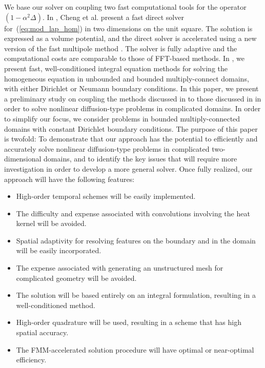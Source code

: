 \documentclass[preprint,12pt]{elsarticle}
\newcommand{\eqr}[1]{~(\ref{#1})}
\begin{document}
We base our solver on coupling two fast computational tools for the operator $(1-\alpha^2 \Delta)$. 
In \cite{modified:helmholtz}, Cheng et al. present a fast direct solver for\eqr{eq:mod_lap_hom} in two dimensions on the unit square.  
The solution is expressed as a volume potential, and the direct solver is accelerated using a new version of the fast multipole method \cite{screened_coulomb, new_FMM}. 
The solver is fully adaptive and the computational costs are comparable to those of FFT-based methods.
In \cite{KROP_QUAIFE_1}, we present fast, well-conditioned integral equation methods for solving the homogeneous equation in unbounded and bounded multiply-connect domains, with either Dirichlet or Neumann boundary conditions. 
In this paper, we present a preliminary study on coupling the methods discussed in \cite{modified:helmholtz} to those discussed in \cite{KROP_QUAIFE_1} in order to solve nonlinear diffusion-type problems in complicated domains. In order to simplify our focus, we consider problems in bounded multiply-connected domains with constant Dirichlet boundary conditions. 
The purpose of this paper is twofold: To demonstrate that our approach has the potential to efficiently and accurately solve nonlinear diffusion-type problems in complicated two-dimensional domains, and to identify the key issues that will require more investigation in order to develop a more general solver. 
Once fully realized, our approach will have the following features:
\begin{itemize}
\item High-order temporal schemes will be easily implemented.
\item The difficulty and expense associated with convolutions involving the heat kernel will be avoided. 
\item Spatial adaptivity for resolving features on the boundary and in the domain will be easily incorporated.
\item The expense associated with generating an unstructured mesh for complicated geometry will be avoided.  
\item The solution will be based entirely on an integral formulation, resulting in a well-conditioned method.
\item High-order quadrature will be used, resulting in a scheme that has high spatial accuracy. 
\item The FMM-accelerated solution procedure will have optimal or near-optimal efficiency.
\end{itemize}
\end{document}
